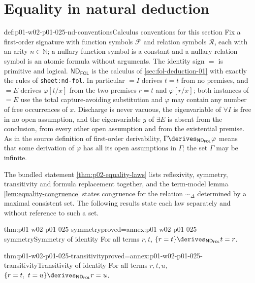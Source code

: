 \section{Equality in natural deduction}
\label{sec:p01-w02-p01-025-equality}

\begin{hbconvention}{def:p01-w02-p01-025-nd-conventions}{Calculus conventions for this section}
Fix a first-order signature with function symbols \(\mathcal F\) and
relation symbols \(\mathcal R\), each with an arity \(n\in\mathbb N\); a
nullary function symbol is a constant and a nullary relation symbol is an
atomic formula without arguments.  The identity sign \(=\) is primitive and
logical.  \(\mathsf{ND}_{\mathsf{FOL}}\) is the calculus of
\cref{sec:fol-deduction-01} with exactly the rules of
\texttt{sheet:nd-fol}.  In particular \(=I\) derives \(t=t\) from no
premises, and \(=E\) derives \(\varphi[t/x]\) from the two premises \(r=t\)
and \(\varphi[r/x]\); both instances of \(=E\) use the total capture-avoiding
substitution
and \(\varphi\) may contain any number of free occurrences of \(x\).
Discharge is never vacuous, the eigenvariable of \(\forall I\) is free in no
open assumption, and the eigenvariable \(y\) of \(\exists E\) is absent from
the conclusion, from every other open assumption and from the existential
premise.  As in the source definition of first-order derivability,
\(\Gamma\derives_{\mathsf{ND}_{\mathsf{FOL}}}\varphi\) means that some
derivation of \(\varphi\) has all its open assumptions in \(\Gamma\); the set
\(\Gamma\) may be infinite.
\end{hbconvention}

The bundled statement \cref{thm:p02-equality-laws} lists reflexivity,
symmetry, transitivity and formula replacement together, and the term-model
lemma \cref{lem:equality-congruence} states congruence for the relation
\(\sim_\Delta\) determined by a maximal consistent set.  The following
results state each law separately and without reference to such a set.

\begin{hblemma}{thm:p01-w02-p01-025-symmetry}{proved=annex:p01-w02-p01-025-symmetry}{Symmetry of identity}
For all terms \(r,t\),
\(\{r=t\}\derives_{\mathsf{ND}_{\mathsf{FOL}}}t=r\).
\end{hblemma}

\begin{hblemma}{thm:p01-w02-p01-025-transitivity}{proved=annex:p01-w02-p01-025-transitivity}{Transitivity of identity}
For all terms \(r,t,u\),
\(\{r=t,\ t=u\}\derives_{\mathsf{ND}_{\mathsf{FOL}}}r=u\).
\end{hblemma}

